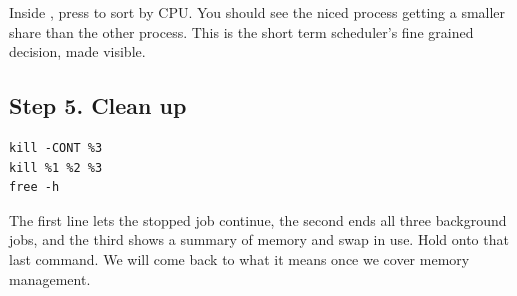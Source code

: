 \documentclass[11pt]{article}
\begin{document}
Inside , press  to sort by CPU. You should see the niced process getting a smaller share than the other  process. This is the short term scheduler's fine grained decision, made visible.

\subsection*{Step 5. Clean up}

\begin{lstlisting}
kill -CONT %3
kill %1 %2 %3
free -h
\end{lstlisting}

The first line lets the stopped job continue, the second ends all three background jobs, and the third shows a summary of memory and swap in use. Hold onto that last command. We will come back to what it means once we cover memory management.
\end{document}

